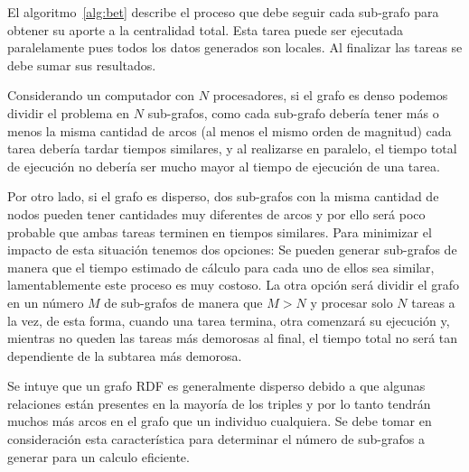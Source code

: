 El algoritmo~\ref{alg:bet} describe el proceso que debe seguir cada sub-grafo
para obtener su aporte a la centralidad total. Esta tarea puede ser ejecutada
paralelamente pues todos los datos generados son locales.
Al finalizar las tareas se debe sumar sus resultados.

Considerando un computador con $N$ procesadores, si el grafo es denso podemos
dividir el problema en $N$ sub-grafos, como cada sub-grafo debería tener más o
menos la misma cantidad de arcos (al menos el mismo orden de magnitud)
cada tarea debería tardar tiempos similares, y al realizarse en paralelo, el
tiempo total de ejecución no debería ser mucho mayor al tiempo de ejecución de
una tarea.

Por otro lado, si el grafo es disperso, dos sub-grafos con la misma cantidad de
nodos pueden tener cantidades muy diferentes de arcos y por ello será poco
probable que ambas tareas terminen en tiempos similares. Para minimizar el
impacto de esta situación tenemos dos opciones: Se pueden generar sub-grafos de
manera que el tiempo estimado de cálculo para cada uno de ellos sea similar,
lamentablemente este proceso es muy costoso.
La otra opción será dividir el grafo en un
número $M$ de sub-grafos de manera que $M > N$ y procesar solo $N$ tareas a la
vez, de esta forma, cuando una tarea termina, otra comenzará su ejecución y,
mientras no queden las tareas más demorosas al final, el tiempo total no será
tan dependiente de la subtarea más demorosa.



Se intuye que un grafo RDF es generalmente disperso debido a que algunas 
relaciones están presentes en la mayoría de los triples y por lo tanto tendrán
muchos más arcos en el grafo que un individuo cualquiera. Se debe tomar en
consideración esta característica para determinar el número de sub-grafos a
generar para un calculo eficiente.
